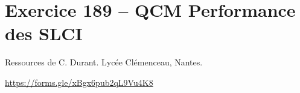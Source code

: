 \section*{Exercice 189 -- QCM Performance des SLCI}
\setcounter{exo}{0}
Ressources de C. Durant. Lycée Clémenceau, Nantes.
\begin{center}
\end{center}

\url{https://forms.gle/xBgx6pub2qL9Vu4K8}